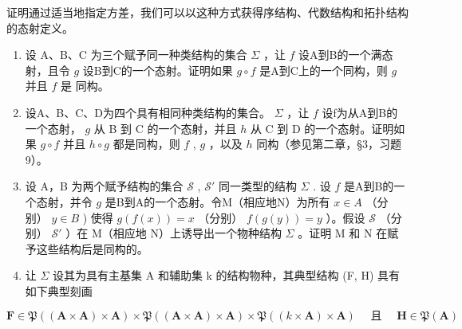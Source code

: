 证明通过适当地指定方差，我们可以以这种方式获得序结构、代数结构和拓扑结构的态射定义。

\begin{enumerate}
\def\labelenumi{\arabic{enumi}.}
\setcounter{enumi}{2}
\item
  设 A、B、C 为三个赋予同一种类结构的集合 \(\Sigma\) ，让 \(f\) 设A到B的一个满态射，且令 \(g\) 设B到C的一个态射。证明如果 \(g \circ f\) 是A到C上的一个同构，则 \(g\) 并且 \(f\) 是 同构。
\item
  设A、B、C、D为四个具有相同种类结构的集合。 \(\Sigma\) ，让 \(f\) 设f为从A到B的一个态射， \(g\) 从 B 到 C 的一个态射，并且 \(h\) 从 C 到 D 的一个态射。证明如果 \(g \circ f\) 并且 \(h \circ g\) 都是同构，则 \(f\) , \(g\) ，以及 \(h\) 同构（参见第二章，§3，习题9）。
\item
  设 A，B 为两个赋予结构的集合 \(\mathcal{S}\) , \(\mathcal{S}'\) 同一类型的结构 \(\Sigma\) . 设 \(f\) 是A到B的一个态射，并令 \(g\) 是B到A的一个态射。令M（相应地N）为所有 \(x \in A\) （分别） \(y \in B\) ) 使得 \(g(f(x)) = x\) （分别） \(f(g(y)) = y\) ）。假设 \(\mathcal{S}\) （分别） \(\mathcal{S}'\) ）在 M（相应地 N）上诱导出一个物种结构 \(\Sigma\) 。证明 M 和 N 在赋予这些结构后是同构的。
\item
  让 \(\Sigma\) 设其为具有主基集 A 和辅助集 k 的结构物种，其典型结构 (F, H) 具有如下典型刻画
\end{enumerate}

\[
\mathbf {F} \in \mathfrak {P} ((\mathbf {A} \times \mathbf {A}) \times \mathbf {A}) \times \mathfrak {P} ((\mathbf {A} \times \mathbf {A}) \times \mathbf {A}) \times \mathfrak {P} ((k \times \mathbf {A}) \times \mathbf {A}) \quad \text { 且 } \quad \mathbf {H} \in \mathfrak {P} (\mathbf {A})
\]

